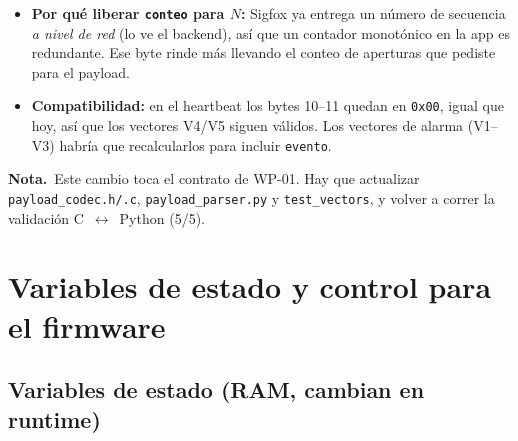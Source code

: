 \documentclass[11pt,a4paper]{article}
\newcommand{\nota}[1]{%
  \begin{center}\begin{minipage}{0.96\linewidth}
  \setlength{\fboxsep}{8pt}%
  \colorbox{Light0G}{\begin{minipage}{\dimexpr\linewidth-2\fboxsep}%
  \textcolor{Gold0G}{\textbf{Nota.}}~#1%
  \end{minipage}}%
  \end{minipage}\end{center}}
\begin{document}
\begin{itemize}[leftmargin=1.4em,itemsep=0.25em]
  \item \textbf{Por qué liberar \texttt{conteo} para $N$:} Sigfox ya entrega un
  número de secuencia \emph{a nivel de red} (lo ve el backend), así que un
  contador monotónico en la app es redundante. Ese byte rinde más llevando el
  conteo de aperturas que pediste para el payload.
  \item \textbf{Compatibilidad:} en el heartbeat los bytes 10--11 quedan en
  \texttt{0x00}, igual que hoy, así que los vectores V4/V5 siguen válidos. Los
  vectores de alarma (V1--V3) habría que recalcularlos para incluir
  \texttt{evento}.
\end{itemize}

\nota{Este cambio toca el contrato de WP-01. Hay que actualizar
\texttt{payload\_codec.h/.c}, \texttt{payload\_parser.py} y \texttt{test\_vectors},
y volver a correr la validación C~$\leftrightarrow$~Python (5/5).}

\section{Variables de estado y control para el firmware}
\label{sec:firmware}

\subsection{Variables de estado (RAM, cambian en runtime)}
\end{document}

